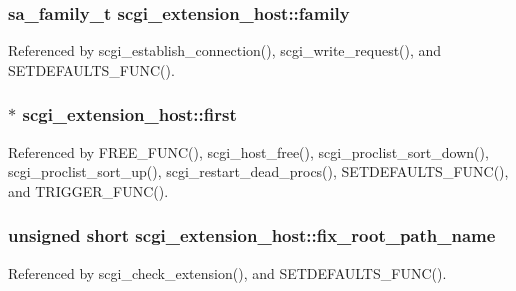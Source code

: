 \hypertarget{structscgi__extension__host_affa00a76eaba150648600020e0826cb1}{
\subsubsection[{family}]{\setlength{\rightskip}{0pt plus 5cm}sa\-\_\-family\-\_\-t scgi\-\_\-extension\-\_\-host\-::family}}\label{structscgi__extension__host_affa00a76eaba150648600020e0826cb1}


Referenced by scgi\-\_\-establish\-\_\-connection(), scgi\-\_\-write\-\_\-request(), and S\-E\-T\-D\-E\-F\-A\-U\-L\-T\-S\-\_\-\-F\-U\-N\-C().

\hypertarget{structscgi__extension__host_a68199e6f02bf1777843aea32a55bc7c1}{
\subsubsection[{first}]{$\ast$ scgi\-\_\-extension\-\_\-host\-::first}}\label{structscgi__extension__host_a68199e6f02bf1777843aea32a55bc7c1}


Referenced by F\-R\-E\-E\-\_\-\-F\-U\-N\-C(), scgi\-\_\-host\-\_\-free(), scgi\-\_\-proclist\-\_\-sort\-\_\-down(), scgi\-\_\-proclist\-\_\-sort\-\_\-up(), scgi\-\_\-restart\-\_\-dead\-\_\-procs(), S\-E\-T\-D\-E\-F\-A\-U\-L\-T\-S\-\_\-\-F\-U\-N\-C(), and T\-R\-I\-G\-G\-E\-R\-\_\-\-F\-U\-N\-C().

\hypertarget{structscgi__extension__host_a3de63dc76af05d78cbf5a18dcc02a8cb}{
\subsubsection[{fix\-\_\-root\-\_\-path\-\_\-name}]{\setlength{\rightskip}{0pt plus 5cm}unsigned short scgi\-\_\-extension\-\_\-host\-::fix\-\_\-root\-\_\-path\-\_\-name}}\label{structscgi__extension__host_a3de63dc76af05d78cbf5a18dcc02a8cb}


Referenced by scgi\-\_\-check\-\_\-extension(), and S\-E\-T\-D\-E\-F\-A\-U\-L\-T\-S\-\_\-\-F\-U\-N\-C().

